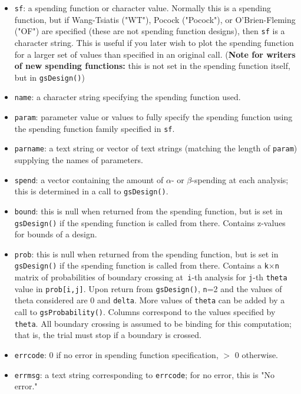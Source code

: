 \begin{itemize}
\item \texttt{sf}: a spending function or character value. Normally this
is a spending function, but if Wang-Tsiatis ("WT"), Pocock ("Pocock"), or
O'Brien-Fleming ("OF") are specified (these are not spending function
designs), then \texttt{sf} is a character string. This is useful if you
later wish to plot the spending function for a larger set of values than
specified in an original call. ({\bf Note for writers of new spending 
functions:} this is not set in the spending function itself, but in 
\texttt{gsDesign()})

\item \texttt{name}: a character string specifying the spending function used.

\item \texttt{param}: parameter value or values to fully specify the
spending function using the spending function family specified in \texttt{sf}.

\item \texttt{parname}: a text string or vector of text strings (matching
the length of \texttt{param}) supplying the names of parameters.

\item \texttt{spend}: a vector containing the amount of $\alpha$- or $\beta
$-spending at each analysis; this is determined in a call to
\texttt{gsDesign()}.

\item \texttt{bound}: this is null when returned from the spending function,
but is set in \texttt{gsDesign()} if the spending function is called from
there. Contains z-values for bounds of a design.

\item \texttt{prob}: this is null when returned from the spending function,
but is set in \texttt{gsDesign()} if the spending function is called from
there. Contains a \texttt{k}$\times$\texttt{n} matrix of probabilities of
boundary crossing at\texttt{\ i}-th analysis for \texttt{j}-th \texttt{theta}
value in \texttt{prob[i,j]}. Upon return from \texttt{gsDesign()},
\texttt{n}=2 and the values of theta considered are 0 and \texttt{delta}. More
values of \texttt{theta} can be added by a call to \texttt{gsProbability()}.
Columns correspond to the values specified by \texttt{theta}. All boundary
crossing is assumed to be binding for this computation; that is, the trial
must stop if a boundary is crossed.

\item \texttt{errcode}: 0 if no error in spending function specification,
$>$
0 otherwise.

\item \texttt{errmsg}: a text string corresponding to \texttt{errcode}; for
no error, this is "No error."
\end{itemize}

